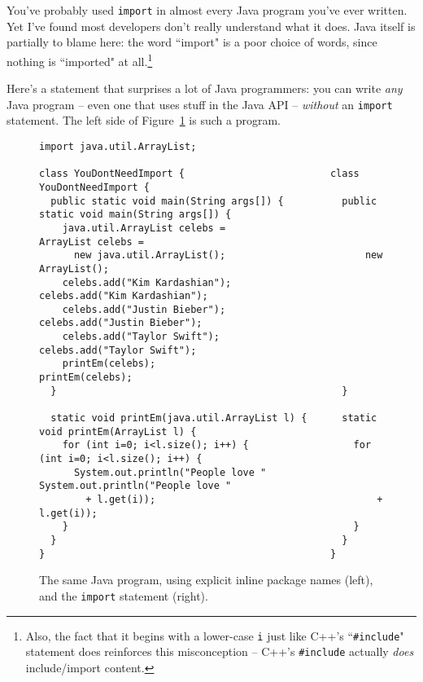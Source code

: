 You've probably used \texttt{import} in almost every Java program you've ever
written. Yet I've found most developers don't really understand what it does.
Java itself is partially to blame here: the word ``import" is a poor choice of
words, since nothing is ``imported" at all.\footnote{Also, the fact that it
begins with a lower-case \texttt{i} just like C++'s ``\texttt{\#include}"
statement does reinforces this misconception -- C++'s \texttt{\#include}
actually \textit{does} include/import content.}

Here's a statement that surprises a lot of Java programmers: you can write
\textit{any} Java program -- even one that uses stuff in the Java API --
\textit{without} an \texttt{import} statement. The left side of
Figure~\ref{fig:dontNeedImport} is such a program.

\begin{figure}[ht]
\begin{Verbatim}[fontsize=\scriptsize,samepage=true,frame=single]
                                                  import java.util.ArrayList;

class YouDontNeedImport {                         class YouDontNeedImport {                                                 
  public static void main(String args[]) {          public static void main(String args[]) {
    java.util.ArrayList celebs =                      ArrayList celebs =
      new java.util.ArrayList();                        new ArrayList();
    celebs.add("Kim Kardashian");                     celebs.add("Kim Kardashian");
    celebs.add("Justin Bieber");                      celebs.add("Justin Bieber");
    celebs.add("Taylor Swift");                       celebs.add("Taylor Swift");
    printEm(celebs);                                  printEm(celebs);
  }                                                 }
                                                
  static void printEm(java.util.ArrayList l) {      static void printEm(ArrayList l) {
    for (int i=0; i<l.size(); i++) {                  for (int i=0; i<l.size(); i++) {
      System.out.println("People love "                 System.out.println("People love "
        + l.get(i));                                      + l.get(i));
    }                                                 }
  }                                                 }
}                                                 }
\end{Verbatim}
\caption{The same Java program, using explicit inline package names (left),
and the \texttt{import} statement (right).}
\label{fig:dontNeedImport}
\end{figure}

